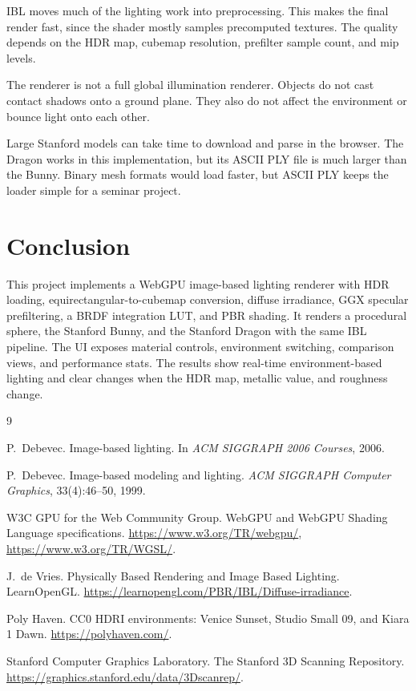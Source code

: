 \documentclass{egpubl}
\begin{document}
IBL moves much of the lighting work into preprocessing.
This makes the final render fast, since the shader mostly samples precomputed textures.
The quality depends on the HDR map, cubemap resolution, prefilter sample count, and mip levels.

The renderer is not a full global illumination renderer.
Objects do not cast contact shadows onto a ground plane.
They also do not affect the environment or bounce light onto each other.

Large Stanford models can take time to download and parse in the browser.
The Dragon works in this implementation, but its ASCII PLY file is much larger than the Bunny.
Binary mesh formats would load faster, but ASCII PLY keeps the loader simple for a seminar project.

\section{Conclusion}

This project implements a WebGPU image-based lighting renderer with HDR loading, equirectangular-to-cubemap conversion, diffuse irradiance, GGX specular prefiltering, a BRDF integration LUT, and PBR shading.
It renders a procedural sphere, the Stanford Bunny, and the Stanford Dragon with the same IBL pipeline.
The UI exposes material controls, environment switching, comparison views, and performance stats.
The results show real-time environment-based lighting and clear changes when the HDR map, metallic value, and roughness change.

\begin{thebibliography}{9}

    P.~Debevec.
    \newblock Image-based lighting.
    \newblock In \emph{ACM SIGGRAPH 2006 Courses}, 2006.

    P.~Debevec.
    \newblock Image-based modeling and lighting.
    \newblock \emph{ACM SIGGRAPH Computer Graphics}, 33(4):46--50, 1999.

    W3C GPU for the Web Community Group.
    \newblock WebGPU and WebGPU Shading Language specifications.
    \newblock \url{https://www.w3.org/TR/webgpu/}, \url{https://www.w3.org/TR/WGSL/}.

    J.~de Vries.
    \newblock Physically Based Rendering and Image Based Lighting.
    \newblock LearnOpenGL.
    \newblock \url{https://learnopengl.com/PBR/IBL/Diffuse-irradiance}.

    Poly Haven.
    \newblock CC0 HDRI environments: Venice Sunset, Studio Small 09, and Kiara 1 Dawn.
    \newblock \url{https://polyhaven.com/}.

    Stanford Computer Graphics Laboratory.
    \newblock The Stanford 3D Scanning Repository.
    \newblock \url{https://graphics.stanford.edu/data/3Dscanrep/}.

\end{thebibliography}
\end{document}
